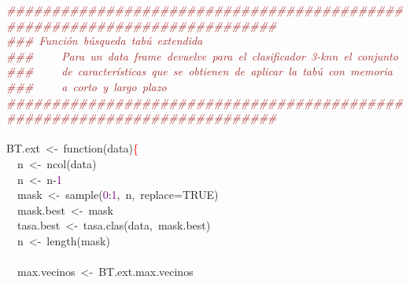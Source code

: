 \noindent
\mbox{}\textit{\textcolor{Brown}{\#\#\#\#\#\#\#\#\#\#\#\#\#\#\#\#\#\#\#\#\#\#\#\#\#\#\#\#\#\#\#\#\#\#\#\#\#\#\#\#\#\#\#\#\#\#\#\#\#\#\#\#\#\#\#\#\#\#\#\#\#\#\#\#\#\#\#\#\#\#\#\#\#\#}} \\
\mbox{}\textit{\textcolor{Brown}{\#\#\#\ Función\ búsqueda\ tabú\ extendida}} \\
\mbox{}\textit{\textcolor{Brown}{\#\#\#\ \ \ \ \ Para\ un\ data\ frame\ devuelve\ para\ el\ clasificador\ 3-knn\ el\ conjunto}} \\
\mbox{}\textit{\textcolor{Brown}{\#\#\#\ \ \ \ \ de\ características\ que\ se\ obtienen\ de\ aplicar\ la\ tabú\ con\ memoria}} \\
\mbox{}\textit{\textcolor{Brown}{\#\#\#\ \ \ \ \ a\ corto\ y\ largo\ plazo}} \\
\mbox{}\textit{\textcolor{Brown}{\#\#\#\#\#\#\#\#\#\#\#\#\#\#\#\#\#\#\#\#\#\#\#\#\#\#\#\#\#\#\#\#\#\#\#\#\#\#\#\#\#\#\#\#\#\#\#\#\#\#\#\#\#\#\#\#\#\#\#\#\#\#\#\#\#\#\#\#\#\#\#\#\#\#}} \\
\mbox{} \\
\mbox{}BT\textcolor{BrickRed}{.}ext\ \textcolor{BrickRed}{\textless{}-}\ function\textcolor{BrickRed}{(}data\textcolor{BrickRed}{)}\textcolor{Red}{\{} \\
\mbox{}\ \ n\ \textcolor{BrickRed}{\textless{}-}\ ncol\textcolor{BrickRed}{(}data\textcolor{BrickRed}{)} \\
\mbox{}\ \ n\ \textcolor{BrickRed}{\textless{}-}\ n\textcolor{BrickRed}{-}\textcolor{Purple}{1} \\
\mbox{}\ \ mask\ \textcolor{BrickRed}{\textless{}-}\ sample\textcolor{BrickRed}{(}\textcolor{Purple}{0}\textcolor{BrickRed}{:}\textcolor{Purple}{1}\textcolor{BrickRed}{,}\ n\textcolor{BrickRed}{,}\ replace\textcolor{BrickRed}{=}TRUE\textcolor{BrickRed}{)} \\
\mbox{}\ \ mask\textcolor{BrickRed}{.}best\ \textcolor{BrickRed}{\textless{}-}\ mask \\
\mbox{}\ \ tasa\textcolor{BrickRed}{.}best\ \textcolor{BrickRed}{\textless{}-}\ tasa\textcolor{BrickRed}{.}clas\textcolor{BrickRed}{(}data\textcolor{BrickRed}{,}\ mask\textcolor{BrickRed}{.}best\textcolor{BrickRed}{)} \\
\mbox{}\ \ n\ \textcolor{BrickRed}{\textless{}-}\ length\textcolor{BrickRed}{(}mask\textcolor{BrickRed}{)} \\
\mbox{}\ \  \\
\mbox{}\ \ max\textcolor{BrickRed}{.}vecinos\ \textcolor{BrickRed}{\textless{}-}\ BT\textcolor{BrickRed}{.}ext\textcolor{BrickRed}{.}max\textcolor{BrickRed}{.}vecinos \\
